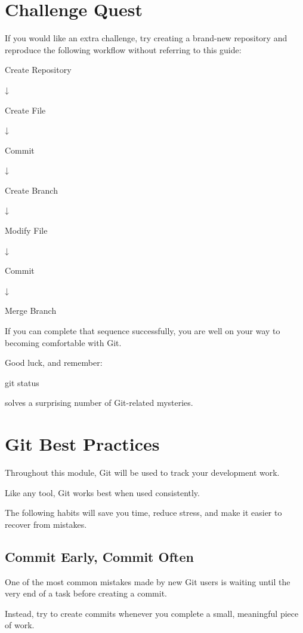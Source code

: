 \documentclass{csc2059practical}
\begin{document}
\section{Challenge Quest}
If you would like an extra challenge, try creating a brand-new repository and reproduce the following workflow without referring to this guide:
\begin{center}
  
  Create Repository
  
  ↓
  
  Create File
  
  ↓
  
  Commit
  
  ↓
  
  Create Branch
  
  ↓
  
  Modify File
  
  ↓
  
  Commit
  
  ↓
  
  Merge Branch
\end{center}

If you can complete that sequence successfully, you are well on your way to becoming comfortable with Git.

Good luck, and remember:

\begin{terminalplain}
git status
\end{terminalplain}
solves a surprising number of Git-related mysteries.

\section{Git Best Practices}
Throughout this module, Git will be used to track your development work.

Like any tool, Git works best when used consistently.

The following habits will save you time, reduce stress, and make it easier to recover from mistakes.

\subsection{Commit Early, Commit Often}
One of the most common mistakes made by new Git users is waiting until the very end of a task before creating a commit.

Instead, try to create commits whenever you complete a small, meaningful piece of work.
\end{document}
